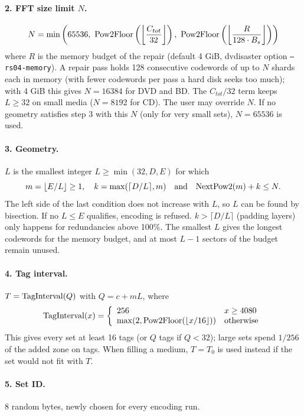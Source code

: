 \paragraph{2. FFT size limit $N$.}
\[ N = \min\left(65536,\ {\rm Pow2Floor}\left(\left\lfloor
    \frac{C_{tot}}{32} \right\rfloor\right),\ {\rm Pow2Floor}\left(
    \left\lfloor\frac{R}{128 \cdot B_s}\right\rfloor\right)\right) \]
where $R$ is the memory budget of the repair (default 4 GiB, dvdisaster
option {\tt --rs04-memory}). A repair pass
holds 128 consecutive codewords of up to $N$ shards each in memory (with
fewer codewords per pass a hard disk seeks too much); with 4 GiB this gives
$N = 16384$ for DVD and BD. The $C_{tot}/32$ term keeps $L \ge 32$ on small media
($N = 8192$ for CD). The user may override $N$. If no geometry satisfies
step 3 with this $N$ (only for very small sets), $N = 65536$ is used.

\paragraph{3. Geometry.} $L$ is the smallest integer
$L \ge \min(32, D, E)$ for which
\[ m = \lfloor E / L \rfloor \ge 1, \quad
   k = \max(\lceil D/L \rceil, m) \quad \mbox{and} \quad
   {\rm NextPow2}(m) + k \le N . \]
The left side of the last condition does not increase with $L$, so $L$ can
be found by bisection. If no $L \le E$ qualifies, encoding is refused.
$k > \lceil D/L \rceil$ (padding layers) only happens for redundancies above
100\%. The smallest $L$ gives the longest codewords for the memory budget,
and at most $L-1$ sectors of the budget remain unused.

\paragraph{4. Tag interval.} $T = {\rm TagInterval}(Q)$ with $Q = c + mL$,
where
\[ {\rm TagInterval}(x) = \left\{ \begin{array}{ll} 256 & x \ge 4080 \\
   \max(2, {\rm Pow2Floor}(\lfloor x/16 \rfloor)) & \mbox{otherwise}
   \end{array}\right. \]
This gives every set at least 16 tags (or $Q$ tags if $Q < 32$); large sets
spend $1/256$ of the added zone on tags. When filling a medium, $T = T_0$ is
used instead if the set would not fit with $T$.

\paragraph{5. Set ID.} 8 random bytes, newly chosen for every encoding run.

